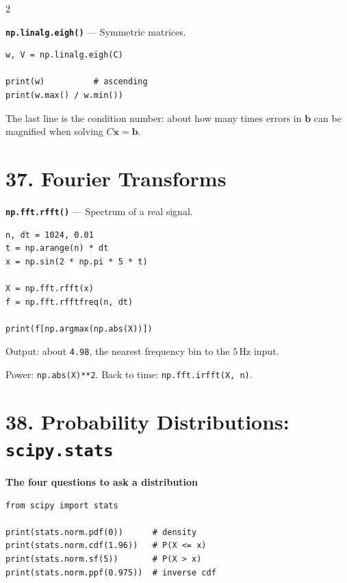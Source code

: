 \documentclass[10pt,a4paper]{article}
\begin{document}
\begin{multicols}{2}
\begin{card}
\textbf{\texttt{np.linalg.eigh()}} --- Symmetric matrices.

\begin{lstlisting}[style=pythonstyle]
w, V = np.linalg.eigh(C)

print(w)          # ascending
print(w.max() / w.min())
\end{lstlisting}

The last line is the condition number: about how many times errors in
$\mathbf b$ can be magnified when solving $C\mathbf x=\mathbf b$.
\end{card}

\section*{37. Fourier Transforms}

\begin{card}
\textbf{\texttt{np.fft.rfft()}} --- Spectrum of a real signal.

\begin{lstlisting}[style=pythonstyle]
n, dt = 1024, 0.01
t = np.arange(n) * dt
x = np.sin(2 * np.pi * 5 * t)

X = np.fft.rfft(x)
f = np.fft.rfftfreq(n, dt)

print(f[np.argmax(np.abs(X))])
\end{lstlisting}

Output: about \texttt{4.98}, the nearest frequency bin to the $5$\,Hz input.

Power: \texttt{np.abs(X)**2}. Back to time: \texttt{np.fft.irfft(X, n)}.
\end{card}

\section*{38. Probability Distributions: \texttt{scipy.stats}}

\begin{card}
\textbf{The four questions to ask a distribution}

\begin{lstlisting}[style=pythonstyle]
from scipy import stats

print(stats.norm.pdf(0))      # density
print(stats.norm.cdf(1.96))   # P(X <= x)
print(stats.norm.sf(5))       # P(X > x)
print(stats.norm.ppf(0.975))  # inverse cdf
\end{lstlisting}


\end{card}
\end{multicols}
\end{document}
